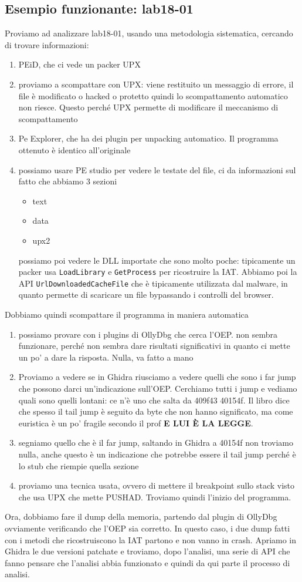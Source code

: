 \documentclass[12pt, oneside]{extbook}
\begin{document}
\subsection{Esempio funzionante: lab18-01}
Proviamo ad analizzare lab18-01, usando una metodologia sistematica, cercando di trovare informazioni:
\begin{enumerate}
\item PEiD, che ci vede un packer UPX
\item proviamo a scompattare con UPX: viene restituito un messaggio di errore, il file è modificato o hacked o protetto quindi lo scompattamento automatico non riesce. Questo perché UPX permette di modificare il meccanismo di scompattamento
\item Pe Explorer, che ha dei plugin per unpacking automatico. Il programma ottenuto è identico all'originale
\item possiamo usare PE studio per vedere le testate del file, ci da informazioni sul fatto che abbiamo 3 sezioni
\begin{itemize}
\item text
\item data
\item upx2
\end{itemize}
possiamo poi vedere le DLL importate che sono molto poche: tipicamente un packer usa \texttt{LoadLibrary} e \texttt{GetProcess} per ricostruire la IAT. Abbiamo poi la API \texttt{UrlDownloadedCacheFile} che è tipicamente utilizzata dal malware, in quanto permette di scaricare un file bypassando i controlli del browser.
\end{enumerate}
Dobbiamo quindi scompattare il programma in maniera automatica
\begin{enumerate}
\item possiamo provare con i plugins di OllyDbg che cerca l'OEP. non sembra funzionare, perché non sembra dare risultati significativi in quanto ci mette un po' a dare la risposta. Nulla, va fatto a mano
\item Proviamo a vedere se in Ghidra riusciamo a vedere quelli che sono i far jump che possono darci un'indicazione sull'OEP. Cerchiamo tutti i jump e vediamo quali sono quelli lontani: ce n'è uno che salta da 409f43 40154f. Il libro dice che spesso il tail jump è seguito da byte che non hanno significato, ma come euristica è un po' fragile secondo il prof \textbf{E LUI È LA LEGGE}.
\item segniamo quello che è il far jump, saltando in Ghidra a 40154f non troviamo nulla, anche questo è un indicazione che potrebbe essere il tail jump perché è lo stub che riempie quella sezione
\item proviamo una tecnica usata, ovvero di mettere il breakpoint sullo stack visto che usa UPX che mette PUSHAD. Troviamo quindi l'inizio del programma.
\end{enumerate}
Ora, dobbiamo fare il dump della memoria, partendo dal plugin di OllyDbg ovviamente verificando che l'OEP sia corretto. In questo caso, i due dump fatti con i metodi che ricostruiscono la IAT partono e non vanno in crash. Apriamo in Ghidra le due versioni patchate e troviamo, dopo l'analisi, una serie di API che fanno pensare che l'analisi abbia funzionato e quindi da qui parte il processo di analisi.
\end{document}
